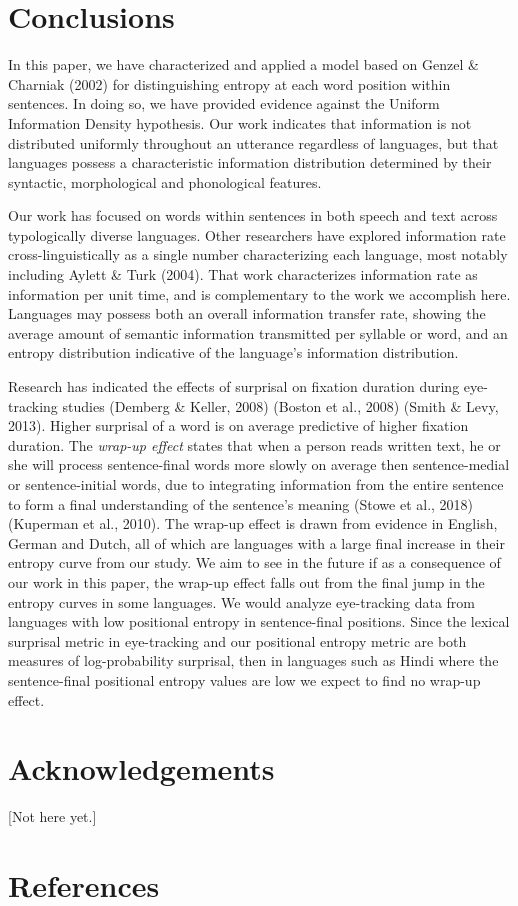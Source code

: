 \documentclass[10pt, letterpaper]{article}
\begin{document}
\section{Conclusions}\label{conclusions}

In this paper, we have characterized and applied a model based on Genzel
\& Charniak (2002) for distinguishing entropy at each word position
within sentences. In doing so, we have provided evidence against the
Uniform Information Density hypothesis. Our work indicates that
information is not distributed uniformly throughout an utterance
regardless of languages, but that languages possess a characteristic
information distribution determined by their syntactic, morphological
and phonological features.

Our work has focused on words within sentences in both speech and text
across typologically diverse languages. Other researchers have explored
information rate cross-linguistically as a single number characterizing
each language, most notably including Aylett \& Turk (2004). That work
characterizes information rate as information per unit time, and is
complementary to the work we accomplish here. Languages may possess both
an overall information transfer rate, showing the average amount of
semantic information transmitted per syllable or word, and an entropy
distribution indicative of the language's information distribution.

Research has indicated the effects of surprisal on fixation duration
during eye-tracking studies (Demberg \& Keller, 2008) (Boston et al.,
2008) (Smith \& Levy, 2013). Higher surprisal of a word is on average
predictive of higher fixation duration. The \emph{wrap-up effect} states
that when a person reads written text, he or she will process
sentence-final words more slowly on average then sentence-medial or
sentence-initial words, due to integrating information from the entire
sentence to form a final understanding of the sentence's meaning (Stowe
et al., 2018) (Kuperman et al., 2010). The wrap-up effect is drawn from
evidence in English, German and Dutch, all of which are languages with a
large final increase in their entropy curve from our study. We aim to
see in the future if as a consequence of our work in this paper, the
wrap-up effect falls out from the final jump in the entropy curves in
some languages. We would analyze eye-tracking data from languages with
low positional entropy in sentence-final positions. Since the lexical
surprisal metric in eye-tracking and our positional entropy metric are
both measures of log-probability surprisal, then in languages such as
Hindi where the sentence-final positional entropy values are low we
expect to find no wrap-up effect.

\section{Acknowledgements}\label{acknowledgements}

{[}Not here yet.{]}

\section{References}\label{references}

\setlength{\parindent}{-0.1in} \setlength{\leftskip}{0.125in} \noindent


\end{document}
